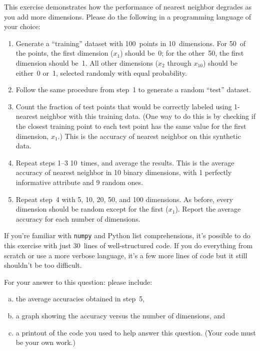 \begin{problem}
   This exercise demonstrates how the performance of nearest neighbor degrades as you add more dimensions. Please do the following in a programming language of your choice:

\begin{enumerate}
  \item Generate a “training” dataset with 100~points in 10~dimensions. For 50~of the points, the first dimension ($x_1$) should be~0; for the other~50, the first dimension should be~1. All other dimensions ($x_2$ through $x_{10}$) should be either~0 or~1, selected randomly with equal probability.

  \item Follow the same procedure from step~1 to generate a random ``test'' dataset.

  \item Count the fraction of test points that would be correctly labeled using 1-nearest neighbor with this training data. (One way to do this is by checking if the closest training point to each test point has the same value for the first dimension, $x_1$.) This is the accuracy of nearest neighbor on this synthetic data.

  \item Repeat steps 1--3 10~times, and average the results. This is the average accuracy of nearest neighbor in 10 binary dimensions, with 1 perfectly informative attribute and 9 random ones.

  \item Repeat step~4 with 5, 10, 20, 50, and 100 dimensions. As before, every dimension should be random except for the first ($x_1$). Report the average accuracy for each number of dimensions.
\end{enumerate}

If you're familiar with \texttt{numpy} and Python list comprehensions, it’s possible to do this exercise with just 30~lines of well-structured code. If you do everything from scratch or use a more verbose language, it’s a few more lines of code but it still shouldn't be too difficult.

For your answer to this question: please include:

\begin{enumerate}[(a)]
  \item the average accuracies obtained in step~5,
  \item a graph showing the accuracy versus the number of dimensions, and
  \item a printout of the code you used to help answer this question. (Your code must be your own work.)
\end{enumerate}
\end{problem}

